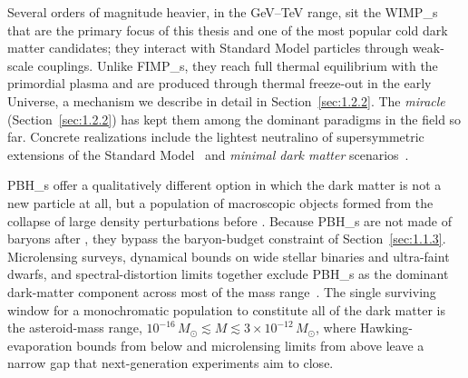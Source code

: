 Several orders of magnitude heavier, in the GeV--TeV range, sit the \glspl{WIMP_} that are the primary focus of this thesis and one of the most popular cold dark matter candidates; they interact with Standard Model particles through weak-scale couplings.
Unlike \glspl{FIMP_}, they reach full thermal equilibrium with the primordial plasma and are produced through thermal freeze-out in the early Universe, a mechanism we describe in detail in Section~\ref{sec:1.2.2}.
The \emph{\WIMP miracle} (Section~\ref{sec:1.2.2}) has kept them among the dominant paradigms in the field so far.
Concrete realizations include the lightest neutralino of supersymmetric extensions of the Standard Model~\cite{Ellis:1983ew} and \emph{minimal dark matter} scenarios~\cite{Cirelli:2005uq}.

\glspl{PBH_} offer a qualitatively different option in which the dark matter is not a new particle at all, but a population of macroscopic objects formed from the collapse of large density perturbations before \BBN.
Because \glspl{PBH_} are not made of baryons after \BBN, they bypass the baryon-budget constraint of Section~\ref{sec:1.1.3}.
Microlensing surveys, dynamical bounds on wide stellar binaries and ultra-faint dwarfs, and \CMB spectral-distortion limits together exclude \glspl{PBH_} as the dominant dark-matter component across most of the mass range~\cite{Carr:2020xqk, bradley_j_kavanagh_2019_3538999}.
The single surviving window for a monochromatic \PBH population to constitute all of the dark matter is the asteroid-mass range, $10^{-16}\,M_\odot \lesssim M \lesssim 3 \times 10^{-12}\,M_\odot$, where Hawking-evaporation bounds from below and microlensing limits from above leave a narrow gap that next-generation experiments aim to close. 

